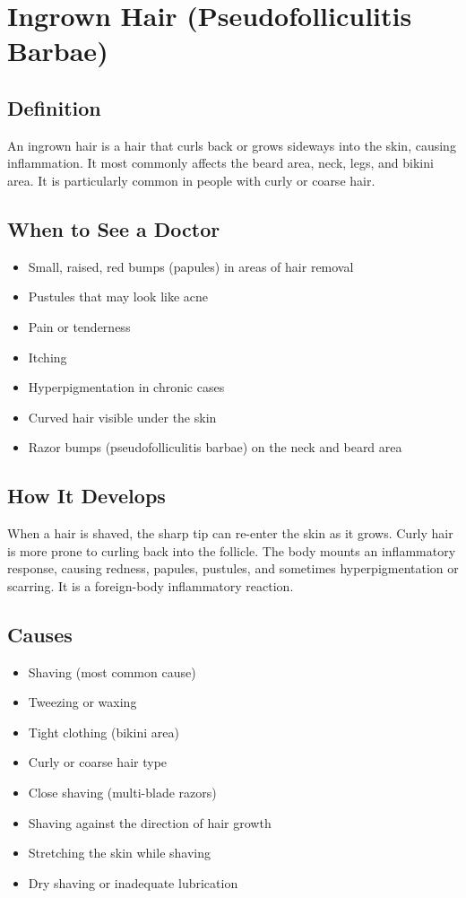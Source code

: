 \chapter{Ingrown Hair (Pseudofolliculitis Barbae)}

\section*{Definition}
An ingrown hair is a hair that curls back or grows sideways into the skin, causing inflammation. It most commonly affects the beard area, neck, legs, and bikini area. It is particularly common in people with curly or coarse hair.

\section*{When to See a Doctor}
\begin{itemize}
\item Small, raised, red bumps (papules) in areas of hair removal
\item Pustules that may look like acne
\item Pain or tenderness
\item Itching
\item Hyperpigmentation in chronic cases
\item Curved hair visible under the skin
\item Razor bumps (pseudofolliculitis barbae) on the neck and beard area
\end{itemize}

\section*{How It Develops}
When a hair is shaved, the sharp tip can re-enter the skin as it grows. Curly hair is more prone to curling back into the follicle. The body mounts an inflammatory response, causing redness, papules, pustules, and sometimes hyperpigmentation or scarring. It is a foreign-body inflammatory reaction.

\section*{Causes}
\begin{itemize}
\item Shaving (most common cause)
\item Tweezing or waxing
\item Tight clothing (bikini area)
\item Curly or coarse hair type
\item Close shaving (multi-blade razors)
\item Shaving against the direction of hair growth
\item Stretching the skin while shaving
\item Dry shaving or inadequate lubrication
\end{itemize}

